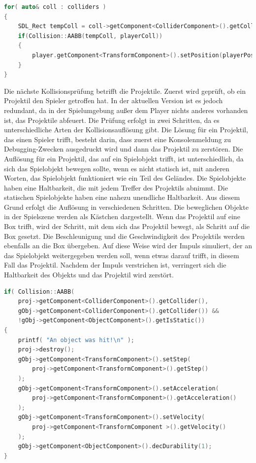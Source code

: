 \documentclass[
  10pt,
  a4paper,
  oneside,
  headers,
  headinclude,
  footinclude,
  BCOR5mm,
]{article}
\begin{document}
\begin{lstlisting}[language=C++]
for( auto& coll : colliders )
{
    SDL_Rect tempColl = coll->getComponent<ColliderComponent>().getCollider();
    if(Collision::AABB(tempColl, playerColl))
    {
        player.getComponent<TransformComponent>().setPosition(playerPos);
    }
}
\end{lstlisting}

Die nächste Kollisionsprüfung betrifft die Projektile. Zuerst wird geprüft, ob
ein Projektil den Spieler getroffen hat. In der aktuellen Version ist es jedoch
redundant, da in der Spielumgebung außer dem Player nichts anderes vorhanden
ist, das Projektile abfeuert. Die Prüfung erfolgt in zwei Schritten, da es
unterschiedliche Arten der Kollisionsauflösung gibt. Die Lösung für ein
Projektil, das einen Spieler trifft, besteht darin, dass zuerst eine
Konsolenmeldung zu Debugging-Zwecken ausgedruckt wird und dann das Projektil zu
zerstören. Die Auflösung für ein Projektil, das auf ein Spielobjekt trifft, ist
unterschiedlich, da sich das Spielobjekt bewegen sollte, wenn es nicht statisch
ist, mit anderen Worten, das Spielobjekt funktioniert wie ein Teil des Geländes.
Die Spielobjekte haben eine Haltbarkeit, die mit jedem Treffer des Projektils
abnimmt. Die statischen Spielobjekte haben eine nahezu unendliche Haltbarkeit.
Aus diesem Grund erfolgt die Auflösung in verschiedenen Schritten. Die
beweglichen Objekte in der Spielszene werden als Kästchen dargestellt. Wenn das
Projektil auf eine Box trifft, wird der Schritt, mit dem sich das Projektil
bewegt, als Schritt auf die Box gesetzt. Die Beschleunigung und die
Geschwindigkeit des Projektils werden ebenfalls an die Box übergeben. Auf diese
Weise wird der Impuls simuliert, der an das Spielobjekt weitergegeben werden
soll, wenn etwas darauf trifft, in diesem Fall das Projektil. Nachdem der Impuls
verstrichen ist, verringert sich die Haltbarkeit des Objekts und das Projektil
wird zerstört.

\begin{lstlisting}[language=C++]
if( Collision::AABB(
    proj->getComponent<ColliderComponent>().getCollider(),
    gObj->getComponent<ColliderComponent>().getCollider()) &&
    !gObj->getComponent<ObjectComponent>().getIsStatic())
{
    printf( "An object was hit!\n" );
    proj->destroy();
    gObj->getComponent<TransformComponent>().setStep(
        proj->getComponent<TransformComponent>().getStep()
    );
    gObj->getComponent<TransformComponent>().setAcceleration(
        proj->getComponent<TransformComponent>().getAcceleration()
    );
    gObj->getComponent<TransformComponent>().setVelocity(
        proj->getComponent<TransformComponent >().getVelocity()
    );
    gObj->getComponent<ObjectComponent>().decDurability(1);
}
\end{lstlisting}
\end{document}
